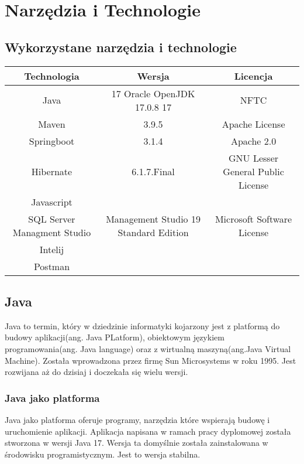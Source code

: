 \chapter{Narzędzia i Technologie}


\section{Wykorzystane narzędzia i technologie}
\begin{adjustwidth}{-2cm}{}
\begin{tabular}{|c|c|c|}
    \hline
    Technologia & Wersja & Licencja \\
    \hline
    Java & 17 Oracle OpenJDK 17.0.8 17 &  NFTC\\
    \hline
    Maven & 3.9.5 & Apache License\\
    \hline
    Springboot & 3.1.4 & Apache 2.0\\
    \hline
    Hibernate & 6.1.7.Final & GNU Lesser General Public License \\
    \hline
		Javascript & & \\
    \hline
		SQL Server Managment Studio & Management Studio 19 Standard Edition & Microsoft Software License\\
    \hline
		Intelij & & \\
    \hline
		Postman & & \\
    \hline
		 
\end{tabular}
\end{adjustwidth}

\section{Java}
Java to termin, który w dziedzinie informatyki kojarzony jest z platformą do budowy aplikacji(ang. Java PLatform), obiektowym językiem programowania(ang. Java language) oraz z wirtualną maszyną(ang.Java Virtual Machine). Została wprowadzona przez firmę Sun Microsystems w roku 1995. Jest rozwijana aż do dzisiaj i doczekała się wielu wersji. 

\subsection{Java jako platforma}
Java jako platforma oferuje programy, narzędzia które wspierają budowę i uruchomienie aplikacji. Aplikacja napisana w ramach pracy dyplomowej została stworzona w wersji Java 17. Wersja ta domyślnie została zainstalowana w środowisku programistycznym. Jest to wersja stabilna.

